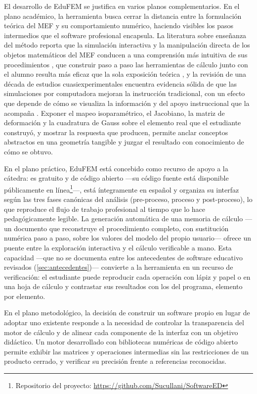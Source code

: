 El desarrollo de EduFEM se justifica en varios planos complementarios. En el plano académico, la herramienta busca cerrar la distancia entre la formulación teórica del MEF y su comportamiento numérico, haciendo visibles los pasos intermedios que el software profesional encapsula. La literatura sobre enseñanza del método reporta que la simulación interactiva y la manipulación directa de los objetos matemáticos del MEF conducen a una comprensión más intuitiva de sus procedimientos \autocites[p.~157]{lee2015interactive}[pp.~872, 874]{lee2015eigenmodes}, que construir paso a paso las herramientas de cálculo junto con el alumno resulta más eficaz que la sola exposición teórica \autocite[p.~17]{bishay2020teaching}, y la revisión de una década de estudios cuasiexperimentales encuentra evidencia sólida de que las simulaciones por computadora mejoran la instrucción tradicional, con un efecto que depende de cómo se visualiza la información y del apoyo instruccional que la acompaña \autocite[p.~136]{rutten2012learning}. Exponer el mapeo isoparamétrico, el Jacobiano, la matriz de deformación y la cuadratura de Gauss sobre el elemento real que el estudiante construyó, y mostrar la respuesta que producen, permite anclar conceptos abstractos en una geometría tangible y juzgar el resultado con conocimiento de cómo se obtuvo.

En el plano práctico, EduFEM está concebido como recurso de apoyo a la cátedra: es gratuito y de código abierto —su código fuente está disponible públicamente en línea\footnote{Repositorio del proyecto: \url{https://github.com/Sucullani/SoftwareED}}—, está íntegramente en español y organiza su interfaz según las tres fases canónicas del análisis (pre-proceso, proceso y post-proceso), lo que reproduce el flujo de trabajo profesional al tiempo que lo hace pedagógicamente legible. La generación automática de una memoria de cálculo —un documento que reconstruye el procedimiento completo, con sustitución numérica paso a paso, sobre los valores del modelo del propio usuario— ofrece un puente entre la exploración interactiva y el cálculo verificable a mano. Esta capacidad —que no se documenta entre los antecedentes de software educativo revisados (\autoref{sec:antecedentes})— convierte a la herramienta en un recurso de verificación: el estudiante puede reproducir cada operación con lápiz y papel o en una hoja de cálculo y contrastar sus resultados con los del programa, elemento por elemento.

En el plano metodológico, la decisión de construir un software propio en lugar de adoptar uno existente responde a la necesidad de controlar la transparencia del motor de cálculo y de alinear cada componente de la interfaz con un objetivo didáctico. Un motor desarrollado con bibliotecas numéricas de código abierto \autocite{harris2020numpy,virtanen2020scipy} permite exhibir las matrices y operaciones intermedias sin las restricciones de un producto cerrado, y verificar su precisión frente a referencias reconocidas.

